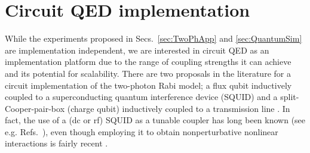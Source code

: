 \section{Circuit QED implementation}\label{sec:cQED}

While the experiments proposed in Secs.~\ref{sec:TwoPhApp} and \ref{sec:QuantumSim} are implementation independent, we are interested in circuit QED as an implementation platform due to the range of coupling strengths it can achieve and its potential for scalability. There are two proposals in the literature for a circuit implementation of the two-photon Rabi model; a flux qubit inductively coupled to a superconducting quantum interference device (SQUID) \cite{ImplementationSC1,ImplementationSC2} and a split-Cooper-pair-box (charge qubit) inductively coupled to a transmission line \cite{ImplementationSC3}. In fact, the use of a (dc or rf) SQUID as a tunable coupler has long been known (see e.g. Refs.~\cite{SQUIDCoupler_00,SQUIDCoupler_01}), even though employing it to obtain nonperturbative nonlinear interactions is fairly recent \cite{CWilson2,JJEmbedded}.

